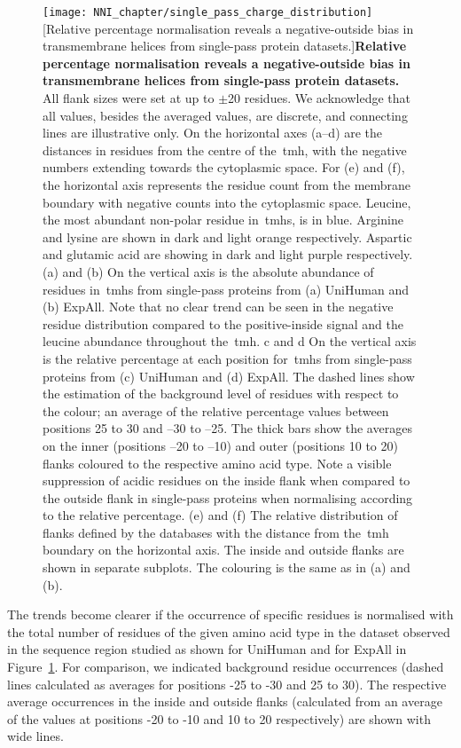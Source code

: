 \begin{figure}[p]
\centering
\texttt{[image: NNI\_chapter/single\_pass\_charge\_distribution]}
[Relative percentage normalisation reveals a negative-outside bias in transmembrane helices from single-pass protein datasets.]{\textbf{Relative percentage normalisation reveals a negative-outside bias in transmembrane helices from single-pass protein datasets.} All flank sizes were set at up to $\pm$20 residues.
We acknowledge that all values, besides the averaged values, are discrete, and connecting lines are illustrative only.
On the horizontal axes (a–d) are the distances in residues from the centre of the~\gls{tmh}, with the negative numbers extending towards the cytoplasmic space.
For (e) and (f), the horizontal axis represents the residue count from the membrane boundary with negative counts into the cytoplasmic space.
Leucine, the most abundant non-polar residue in~\gls{tmh}s, is in blue.
Arginine and lysine are shown in dark and light orange respectively.
Aspartic and glutamic acid are showing in dark and light purple respectively.
(a) and (b) On the vertical axis is the absolute abundance of residues in~\gls{tmh}s from single-pass proteins from (a) UniHuman and (b) ExpAll.
Note that no clear trend can be seen in the negative residue distribution compared to the positive-inside signal and the leucine abundance throughout the~\gls{tmh}.
c and d On the vertical axis is the relative percentage at each position for~\gls{tmh}s from single-pass proteins from (c) UniHuman and (d) ExpAll.
The dashed lines show the estimation of the background level of residues with respect to the colour; an average of the relative percentage values between positions 25 to 30 and –30 to –25.
The thick bars show the averages on the inner (positions –20 to –10) and outer (positions 10 to 20) flanks coloured to the respective amino acid type.
Note a visible suppression of acidic residues on the inside flank when compared to the outside flank in single-pass proteins when normalising according to the relative percentage.
(e) and (f) The relative distribution of flanks defined by the databases with the distance from the~\gls{tmh} boundary on the horizontal axis.
The inside and outside flanks are shown in separate subplots.
The colouring is the same as in (a) and (b).}


\label{fig:single_pass_charge_distribution}
\end{figure}

The trends become clearer if the occurrence of specific residues is normalised with the total number of residues of the given amino acid type in the dataset observed in the sequence region studied as shown for UniHuman and for ExpAll in Figure~\ref{fig:single_pass_charge_distribution}.
For comparison, we indicated background residue occurrences (dashed lines calculated as averages for positions -25 to -30 and 25 to 30).
The respective average occurrences in the inside and outside flanks (calculated from an average of the values at positions -20 to -10 and 10 to 20 respectively) are shown with wide lines.

